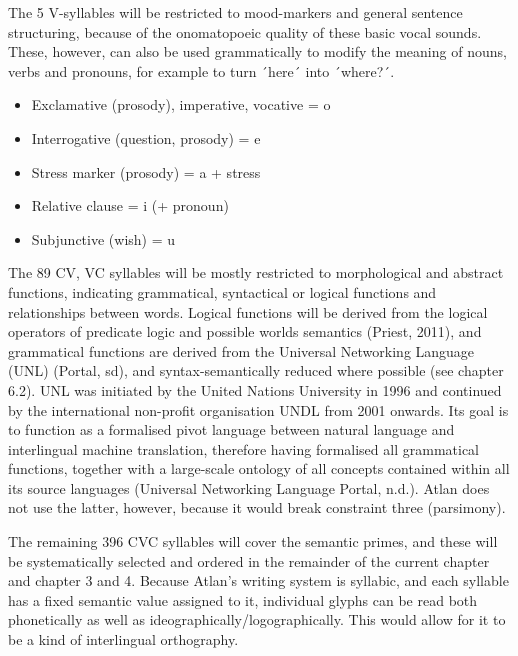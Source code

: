 The 5 V-syllables will be restricted to mood-markers and general sentence structuring, because of the onomatopoeic quality of these basic vocal sounds. These, however, can also be used grammatically to modify the meaning of nouns, verbs and pronouns, for example to turn ´here´ into ´where?´.  
\begin{itemize}
	\item    Exclamative (prosody), imperative, vocative = o  \raisebox{-0.15em}{\Atlano}

\item    Interrogative (question, prosody) = e  \Atlane

\item    Stress marker (prosody) = a + stress \Atlana

\item    Relative clause = i (+ pronoun) \Atlani

\item    Subjunctive (wish) = u \Atlanu
\end{itemize}

 

The 89 CV, VC syllables will be mostly restricted to morphological and abstract functions, indicating grammatical, syntactical or logical functions and relationships between words. Logical functions will be derived from the logical operators of predicate logic and possible worlds semantics (Priest, 2011), and grammatical functions are derived from the Universal Networking Language (UNL) (Portal, sd), and syntax-semantically reduced where possible (see chapter 6.2). UNL was initiated by the United Nations University in 1996 and continued by the international non-profit organisation UNDL from 2001 onwards. Its goal is to function as a formalised pivot language between natural language and interlingual machine translation, therefore having formalised all grammatical functions, together with a large-scale ontology of all concepts contained within all its source languages (Universal Networking Language Portal, n.d.). Atlan does not use the latter, however, because it would break constraint three (parsimony). 	

The remaining 396 CVC syllables will cover the semantic primes, and these will be systematically selected and ordered in the remainder of the current chapter and chapter 3 and 4. Because Atlan’s writing system is syllabic, and each syllable has a fixed semantic value assigned to it, individual glyphs can be read both phonetically as well as ideographically/logographically. This would allow for it to be a kind of interlingual orthography. 


